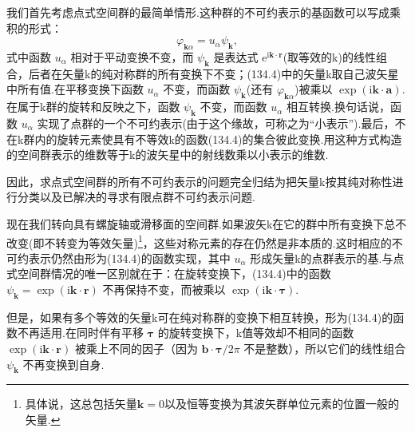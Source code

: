 我们首先考虑点式空间群的最简单情形.这种群的不可约表示的基函数可以写成乘积的形式：
\begin{equation}
  \varphi_{\boldsymbol{k}\alpha}=u_\alpha\psi_{\boldsymbol{k}},
\end{equation}
式中函数 $u_\alpha$ 相对于平动变换不变，而 $\psi_{\boldsymbol{k}}$ 是表达式 $\mathrm{e}^{\mathrm{i}\boldsymbol{k}\cdot\boldsymbol{r}}$(取等效的k)的线性组合，后者在矢量k的纯对称群的所有变换下不变；(134.4)中的矢量k取自己波矢星中所有值.在平移变换下函数 $u_\alpha$ 不变，而函数 $\psi_{\boldsymbol{k}}$(还有 $\varphi_{\boldsymbol{k}\alpha}$)被乘以 $\exp(\mathrm{i}\boldsymbol{k}\cdot\boldsymbol{a})$.在属于k群的旋转和反映之下，函数 $\psi_{\boldsymbol{k}}$ 不变，而函数 $u_\alpha$ 相互转换.换句话说，函数 $u_\alpha$ 实现了点群的一个不可约表示(由于这个缘故，可称之为“小表示”).最后，不在k群内的旋转元素使具有不等效k的函数(134.4)的集合彼此变换.用这种方式构造的空间群表示的维数等于k的波矢星中的射线数乘以小表示的维数.

因此，求点式空间群的所有不可约表示的问题完全归结为把矢量k按其纯对称性进行分类以及已解决的寻求有限点群不可约表示问题.

现在我们转向具有螺旋轴或滑移面的空间群.如果波矢k在它的群中所有变换下总不改变(即不转变为等效矢量)\footnote{具体说，这总包括矢量$\boldsymbol{k}=0$以及恒等变换为其波矢群单位元素的位置一般的矢量.}，这些对称元素的存在仍然是非本质的.这时相应的不可约表示仍然由形为(134.4)的函数实现，其中 $u_\alpha$ 形成矢量k的点群表示的基.与点式空间群情况的唯一区别就在于：在旋转变换下，(134.4)中的函数 $\psi_{\boldsymbol{k}}=\exp(\mathrm{i}\boldsymbol{k}\cdot\boldsymbol{r})$ 不再保持不变，而被乘以 $\exp(\mathrm{i}\boldsymbol{k}\cdot\boldsymbol{\tau})$.

但是，如果有多个等效的矢量k可在纯对称群的变换下相互转换，形为(134.4)的函数不再适用.在同时伴有平移 $\boldsymbol{\tau}$ 的旋转变换下，k值等效却不相同的函数 $\exp(\mathrm{i}\boldsymbol{k}\cdot\boldsymbol{r})$ 被乘上不同的因子（因为 $\boldsymbol{b}\cdot\boldsymbol{\tau}/2\pi$ 不是整数），所以它们的线性组合 $\psi_{\boldsymbol{k}}$ 不再变换到自身.

